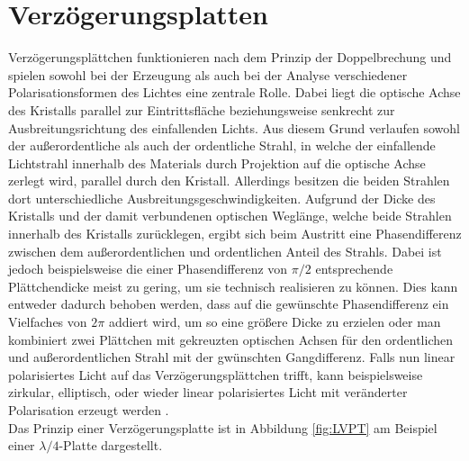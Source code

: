 \documentclass[
class=book,
accentcolor=1b,
custommargins=geometry,
fontsize=11pt,
thesis={type=Versuchsanleitung},
ruledheaders=all,
headline=false,
instbox=false,
marginpar=false,
title=small,
ignore-missing-data=true,
twoside=false,
logofile=apqdesign/tuda_logo.pdf,
pdfa=false %
]{apqpub}
\begin{document}
	\section{Verzögerungsplatten} \label{ssec:lambdaplatte}
Verzögerungsplättchen funktionieren nach dem Prinzip der Doppelbrechung und spielen sowohl bei der Erzeugung als auch bei der Analyse verschiedener Polarisationsformen des Lichtes eine zentrale Rolle.
Dabei liegt die optische Achse des Kristalls parallel zur Eintrittsfläche beziehungsweise senkrecht zur Ausbreitungsrichtung des einfallenden Lichts. 
Aus diesem Grund verlaufen sowohl der außerordentliche als auch der ordentliche Strahl, in welche der einfallende Lichtstrahl innerhalb des Materials durch Projektion auf die optische Achse zerlegt wird, parallel durch den Kristall.
Allerdings besitzen die beiden Strahlen dort unterschiedliche Ausbreitungsgeschwindigkeiten.
Aufgrund der Dicke des Kristalls und der damit verbundenen optischen Weglänge, welche beide Strahlen innerhalb des Kristalls zurücklegen, ergibt sich beim Austritt eine Phasendifferenz zwischen dem außerordentlichen und ordentlichen Anteil des Strahls. 
Dabei ist jedoch beispielsweise die einer Phasendifferenz von $\pi/2$ entsprechende Plättchendicke meist zu gering, um sie technisch realisieren zu können. 
Dies kann entweder dadurch behoben werden, dass auf die gewünschte Phasendifferenz ein Vielfaches von $2\pi$ addiert wird, um so eine größere Dicke zu erzielen oder man kombiniert zwei Plättchen mit gekreuzten optischen Achsen für den ordentlichen und außerordentlichen Strahl mit der gwünschten Gangdifferenz.
Falls nun linear polarisiertes Licht auf das Verzögerungsplättchen trifft, kann beispielsweise zirkular, elliptisch, oder wieder linear polarisiertes Licht mit veränderter Polarisation erzeugt werden \cite{OLL}.\\
Das Prinzip einer Verzögerungsplatte ist in Abbildung \ref{fig:LVPT} am Beispiel einer $\lambda/4$-Platte dargestellt.
\vspace{7pt}
\end{document}
